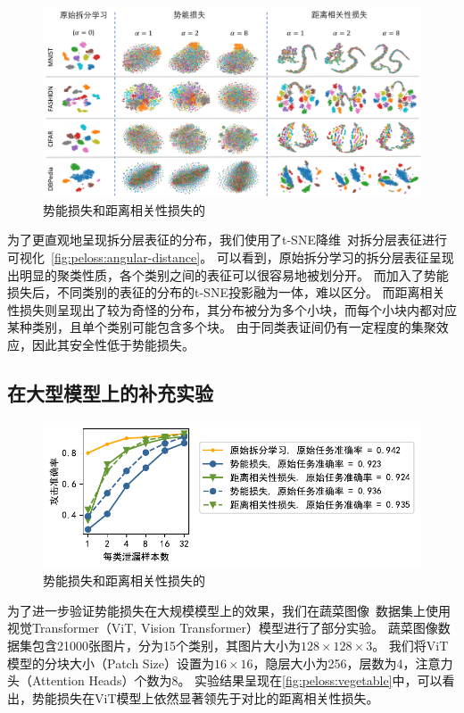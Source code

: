 \begin{figure}[h!]
    \centering
    \includegraphics[width=1\linewidth]{Z_Resources/peloss_tsne}
    \caption{势能损失和距离相关性损失的}
    \label{fig:peloss:angular-distance}
\end{figure}

为了更直观地呈现拆分层表征的分布，我们使用了t-SNE降维~\cite{van_2008_tsne}对拆分层表征进行可视化~\autoref{fig:peloss:angular-distance}。
%
可以看到，原始拆分学习的拆分层表征呈现出明显的聚类性质，各个类别之间的表征可以很容易地被划分开。
%
而加入了势能损失后，不同类别的表征的分布的t-SNE投影融为一体，难以区分。
%
而距离相关性损失则呈现出了较为奇怪的分布，其分布被分为多个小块，而每个小块内都对应某种类别，且单个类别可能包含多个块。
由于同类表证间仍有一定程度的集聚效应，因此其安全性低于势能损失。
%

\subsection{在大型模型上的补充实验}
\begin{figure}[h!]
    \centering
    \includegraphics[width=1\linewidth]{Z_Resources/peloss_vegetable-primary}
    \caption{势能损失和距离相关性损失的}
    \label{fig:peloss:vegetable}
\end{figure}
为了进一步验证势能损失在大规模模型上的效果，我们在蔬菜图像~\cite{}数据集上使用视觉Transformer（ViT, Vision Transformer）模型进行了部分实验。
%
蔬菜图像数据集包含21000张图片，分为15个类别，其图片大小为$128\times 128 \times 3$。
%
我们将ViT模型的分块大小（Patch Size）设置为$16\times 16$，隐层大小为256，层数为4，注意力头（Attention Heads）个数为8。
%
实验结果呈现在\autoref{fig:peloss:vegetable}中，可以看出，势能损失在ViT模型上依然显著领先于对比的距离相关性损失。